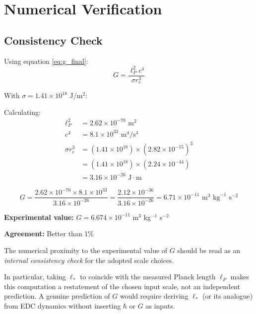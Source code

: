 \newpage

\section{Numerical Verification}
\label{sec:grav_numerical}

\subsection{Consistency Check}

Using equation \eqref{eq:g_final}:
\begin{equation}
G = \frac{\ell_P^2 c^4}{\sigma r_e^3}
\end{equation}

With $\sigma = 1.41 \times 10^{18}$ J/m$^2$:

Calculating:
\begin{align}
\ell_P^2 &= 2.62 \times 10^{-70} \text{ m}^2 \\
c^4 &= 8.1 \times 10^{33} \text{ m}^4/\text{s}^4 \\
\sigma r_e^3 &= (1.41 \times 10^{18}) \times (2.82 \times 10^{-15})^3 \\
&= (1.41 \times 10^{18}) \times (2.24 \times 10^{-44}) \\
&= 3.16 \times 10^{-26} \text{ J} \cdot \text{m}
\end{align}

\begin{equation}
G = \frac{2.62 \times 10^{-70} \times 8.1 \times 10^{33}}{3.16 \times 10^{-26}} = \frac{2.12 \times 10^{-36}}{3.16 \times 10^{-26}} = 6.71 \times 10^{-11} \text{ m}^3 \text{ kg}^{-1} \text{ s}^{-2}
\end{equation}

\textbf{Experimental value:} $G = 6.674 \times 10^{-11}$ m$^3$ kg$^{-1}$ s$^{-2}$

\textbf{Agreement:} Better than 1\%

\begin{tcolorbox}[colback=gray!10,colframe=gray!50,title=Interpretation: Consistency Check Only]
The numerical proximity to the experimental value of $G$ should be read as an \textit{internal consistency check} for the adopted scale choices.

In particular, taking $\ell_*$ to coincide with the measured Planck length $\ell_P$ makes this computation a restatement of the chosen input scale, not an independent prediction. A genuine prediction of $G$ would require deriving $\ell_*$ (or its analogue) from EDC dynamics without inserting $\hbar$ or $G$ as inputs.
\end{tcolorbox}

